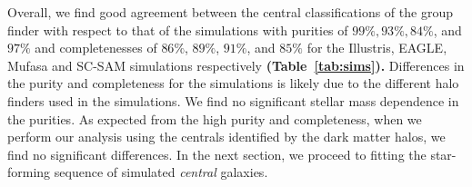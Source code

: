 \documentclass[tighten, preprint]{aastex62}
\begin{document}
Overall, we find good agreement between the central classifications of 
the group finder with respect to that of the simulations %
with purities of 
$99\%, 93\%, 84\%$, and $97\%$ and completenesses of $86\%$, $89\%$, 
$91\%$, and $85\%$ for the Illustris, EAGLE, {\sc Mufasa} and SC-SAM 
simulations respectively 
{\bf \color{red} (Table~\ref{tab:sims}).} 
Differences in the purity and completeness for the 
simulations is likely due to the different halo finders used in the 
simulations. %
We find no significant stellar mass dependence in the purities. %
As expected from the high purity and completeness, when we perform our 
analysis using the centrals identified by the dark matter halos, we 
find no significant differences. %
In the next section, we proceed to fitting the star-forming sequence 
of simulated \emph{central} galaxies. %
\end{document}
